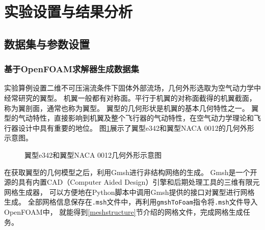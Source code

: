 \section{实验设置与结果分析}

\subsection{数据集与参数设置}

\subsubsection{基于OpenFOAM求解器生成数据集}
实验算例设置二维不可压湍流条件下固体外部流场，几何外形选取为空气动力学中经常研究的翼型。
机翼一般都有对称面。平行于机翼的对称面截得的机翼截面，称为翼剖面，通常也称为翼型。
翼型的几何形状是机翼的基本几何特性之一。
翼型的气动特性，直接影响到机翼及整个飞行器的气动特性，在空气动力学理论和飞行器设计中具有重要的地位。
图\ref{fig:airfoil_example}展示了翼型e342和翼型NACA 0012的几何外形示意图\cite{UIUCsite}。
\begin{figure}[htb]
	\centering
	 \qquad
	\caption{翼型e342和翼型NACA 0012几何外形示意图}
	\label{fig:airfoil_example}
\end{figure}

在获取翼型的几何模型之后，利用Gmsh\cite{gmsh}进行非结构网络的生成。
Gmsh是一个开源的具有内置CAD（Computer Aided Design）引擎和后期处理工具的三维有限元网格生成器，
可以方便地在Python脚本中调用Gmsh提供的接口对翼型进行网格生成。
全部网格信息保存在\texttt{.msh}文件中，再利用\texttt{gmshToFoam}指令将\texttt{.msh}文件导入OpenFOAM中，
就能得到\ref{meshstructure}节介绍的网格文件，完成网格生成任务。

